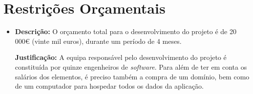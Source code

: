 \section*{Restrições Orçamentais}
{\TextoCor
\begin{itemize}
    \item \textbf{Descrição:} O orçamento total para o desenvolvimento do projeto é de 20 000€ (vinte mil euros), durante um período de 4 meses.
    
    \textbf{Justificação:} A equipa responsável pelo desenvolvimento do projeto é constituída por quinze engenheiros de \textit{software}. Para além de ter em conta os salários dos elementos, é preciso também a compra de um domínio, bem como  de um computador para hospedar todos os dados da aplicação.
\end{itemize}
}